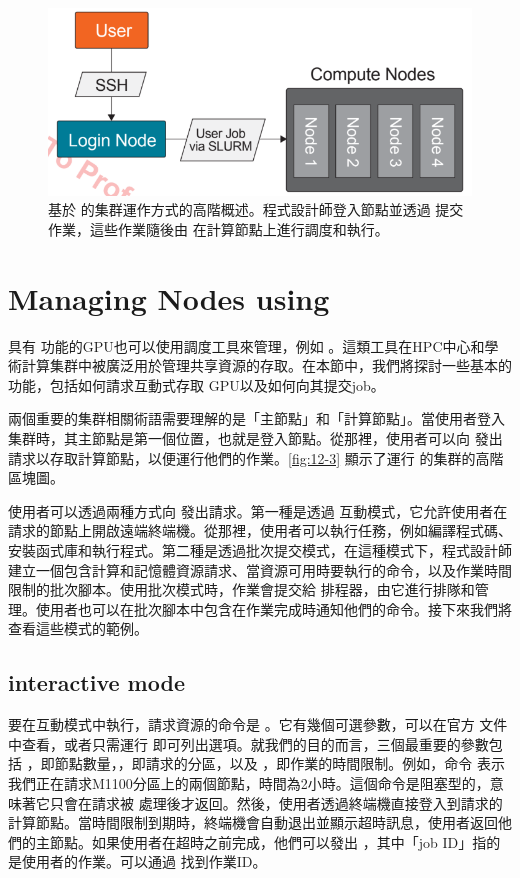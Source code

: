 \begin{figure}[h]
    \centering
    \includegraphics[width=0.75\linewidth]{FileAusiliari//Screenshots/Figure12-3.png}
    \caption{基於  的集群運作方式的高階概述。程式設計師登入節點並透過  提交作業，這些作業隨後由  在計算節點上進行調度和執行。}
    \label{fig:12-3}
\end{figure}

\section{Managing  Nodes using }

具有  功能的GPU也可以使用調度工具來管理，例如 。這類工具在HPC中心和學術計算集群中被廣泛用於管理共享資源的存取。在本節中，我們將探討一些基本的  功能，包括如何請求互動式存取  GPU以及如何向其提交job。

兩個重要的集群相關術語需要理解的是「主節點」和「計算節點」。當使用者登入集群時，其主節點是第一個位置，也就是登入節點。從那裡，使用者可以向  發出請求以存取計算節點，以便運行他們的作業。\autoref{fig:12-3} 顯示了運行  的集群的高階區塊圖。

使用者可以透過兩種方式向  發出請求。第一種是透過  互動模式，它允許使用者在請求的節點上開啟遠端終端機。從那裡，使用者可以執行任務，例如編譯程式碼、安裝函式庫和執行程式。第二種是透過批次提交模式，在這種模式下，程式設計師建立一個包含計算和記憶體資源請求、當資源可用時要執行的命令，以及作業時間限制的批次腳本。使用批次模式時，作業會提交給  排程器，由它進行排隊和管理。使用者也可以在批次腳本中包含在作業完成時通知他們的命令。接下來我們將查看這些模式的範例。 

\subsection{ interactive mode}

要在互動模式中執行，請求資源的命令是 。它有幾個可選參數，可以在官方  文件中查看，或者只需運行  即可列出選項。就我們的目的而言，三個最重要的參數包括 ，即節點數量，，即請求的分區，以及 ，即作業的時間限制。例如，命令  表示我們正在請求M1100分區上的兩個節點，時間為2小時。這個命令是阻塞型的，意味著它只會在請求被  處理後才返回。然後，使用者透過終端機直接登入到請求的計算節點。當時間限制到期時，終端機會自動退出並顯示超時訊息，使用者返回他們的主節點。如果使用者在超時之前完成，他們可以發出 ，其中「job ID」指的是使用者的作業。可以通過  找到作業ID。

